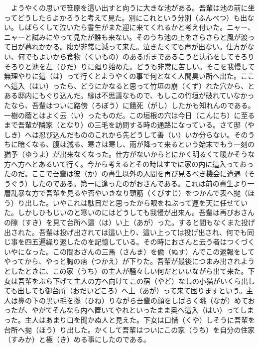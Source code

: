 \documentclass{book}
\begin{document}
　ようやくの思いで笹原を這い出すと向うに大きな池がある。吾輩は池の前に坐ってどうしたらよかろうと考えて見た。別にこれという分別（ふんべつ）も出ない。しばらくして泣いたら書生がまた迎に来てくれるかと考え付いた。ニャー、ニャーと試みにやって見たが誰も来ない。そのうち池の上をさらさらと風が渡って日が暮れかかる。腹が非常に減って来た。泣きたくても声が出ない。仕方がない、何でもよいから食物（くいもの）のある所まであるこうと決心をしてそろりそろりと池を左（ひだ）りに廻り始めた。どうも非常に苦しい。そこを我慢して無理やりに這（は）って行くとようやくの事で何となく人間臭い所へ出た。ここへ這入（はい）ったら、どうにかなると思って竹垣の崩（くず）れた穴から、とある邸内にもぐり込んだ。縁は不思議なもので、もしこの竹垣が破れていなかったなら、吾輩はついに路傍（ろぼう）に餓死（がし）したかも知れんのである。一樹の蔭とはよく云（い）ったものだ。この垣根の穴は今日（こんにち）に至るまで吾輩が隣家（となり）の三毛を訪問する時の通路になっている。さて邸（やしき）へは忍び込んだもののこれから先どうして善（い）いか分らない。そのうちに暗くなる、腹は減る、寒さは寒し、雨が降って来るという始末でもう一刻の猶予（ゆうよ）が出来なくなった。仕方がないからとにかく明るくて暖かそうな方へ方へとあるいて行く。今から考えるとその時はすでに家の内に這入っておったのだ。ここで吾輩は彼（か）の書生以外の人間を再び見るべき機会に遭遇（そうぐう）したのである。第一に逢ったのがおさんである。これは前の書生より一層乱暴な方で吾輩を見るや否やいきなり頸筋（くびすじ）をつかんで表へ抛（ほう）り出した。いやこれは駄目だと思ったから眼をねぶって運を天に任せていた。しかしひもじいのと寒いのにはどうしても我慢が出来ん。吾輩は再びおさんの隙（すき）を見て台所へ這（は）い上（あが）った。すると間もなくまた投げ出された。吾輩は投げ出されては這い上り、這い上っては投げ出され、何でも同じ事を四五遍繰り返したのを記憶している。その時におさんと云う者はつくづくいやになった。この間おさんの三馬（さんま）を偸（ぬす）んでこの返報をしてやってから、やっと胸の痞（つかえ）が下りた。吾輩が最後につまみ出されようとしたときに、この家（うち）の主人が騒々しい何だといいながら出て来た。下女は吾輩をぶら下げて主人の方へ向けてこの宿（やど）なしの小猫がいくら出しても出しても御台所（おだいどころ）へ上（あが）って来て困りますという。主人は鼻の下の黒い毛を撚（ひね）りながら吾輩の顔をしばらく眺（なが）めておったが、やがてそんなら内へ置いてやれといったまま奥へ這入（はい）ってしまった。主人はあまり口を聞かぬ人と見えた。下女は口惜（くや）しそうに吾輩を台所へ抛（ほう）り出した。かくして吾輩はついにこの家（うち）を自分の住家（すみか）と極（き）める事にしたのである。\\
\end{document}
